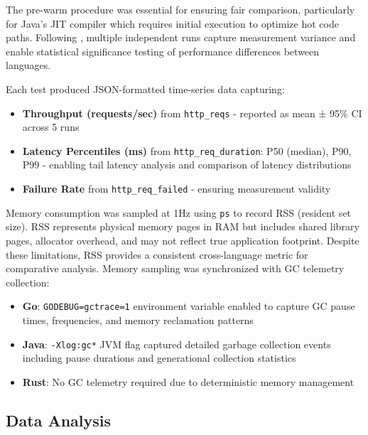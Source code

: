 \documentclass{article}
\begin{document}
The pre-warm procedure was essential for ensuring fair comparison, particularly for Java's JIT compiler which requires initial execution to optimize hot code paths. Following \citet{kalibera2013rigorous}, multiple independent runs capture measurement variance and enable statistical significance testing of performance differences between languages.

Each test produced JSON-formatted time-series data capturing:
\begin{itemize}
    \item \textbf{Throughput (requests/sec)} from \texttt{http\_reqs} - reported as mean ± 95\% CI across 5 runs
    \item \textbf{Latency Percentiles (ms)} from \texttt{http\_req\_duration}: P50 (median), P90, P99 - enabling tail latency analysis and comparison of latency distributions
    \item \textbf{Failure Rate} from \texttt{http\_req\_failed} - ensuring measurement validity
\end{itemize}

Memory consumption was sampled at 1Hz using \texttt{ps} to record RSS (resident set size). RSS represents physical memory pages in RAM but includes shared library pages, allocator overhead, and may not reflect true application footprint. Despite these limitations, RSS provides a consistent cross-language metric for comparative analysis. Memory sampling was synchronized with GC telemetry collection:
\begin{itemize}
    \item \textbf{Go}: \texttt{GODEBUG=gctrace=1} environment variable enabled to capture GC pause times, frequencies, and memory reclamation patterns
    \item \textbf{Java}: \texttt{-Xlog:gc*} JVM flag captured detailed garbage collection events including pause durations and generational collection statistics
    \item \textbf{Rust}: No GC telemetry required due to deterministic memory management
\end{itemize}

\subsection{Data Analysis}
\end{document}

